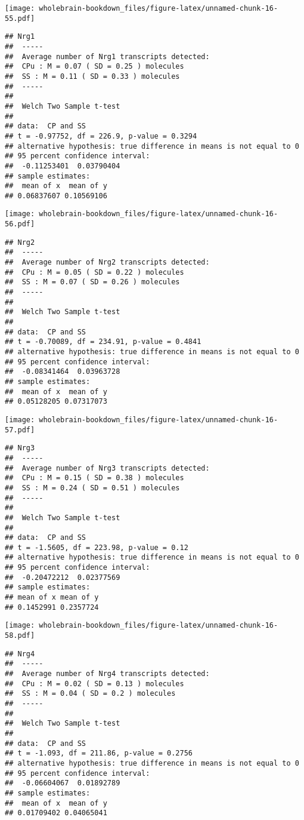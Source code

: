 \documentclass[]{book}
\theoremstyle{definition}
\theoremstyle{definition}
\theoremstyle{remark}
\begin{document}
\texttt{[image: wholebrain-bookdown\_files/figure-latex/unnamed-chunk-16-55.pdf]}

\begin{verbatim}
## Nrg1
##  -----
##  Average number of Nrg1 transcripts detected:
##  CPu : M = 0.07 ( SD = 0.25 ) molecules 
##  SS : M = 0.11 ( SD = 0.33 ) molecules
##  -----
## 
##  Welch Two Sample t-test
## 
## data:  CP and SS
## t = -0.97752, df = 226.9, p-value = 0.3294
## alternative hypothesis: true difference in means is not equal to 0
## 95 percent confidence interval:
##  -0.11253401  0.03790404
## sample estimates:
##  mean of x  mean of y 
## 0.06837607 0.10569106
\end{verbatim}

\texttt{[image: wholebrain-bookdown\_files/figure-latex/unnamed-chunk-16-56.pdf]}

\begin{verbatim}
## Nrg2
##  -----
##  Average number of Nrg2 transcripts detected:
##  CPu : M = 0.05 ( SD = 0.22 ) molecules 
##  SS : M = 0.07 ( SD = 0.26 ) molecules
##  -----
## 
##  Welch Two Sample t-test
## 
## data:  CP and SS
## t = -0.70089, df = 234.91, p-value = 0.4841
## alternative hypothesis: true difference in means is not equal to 0
## 95 percent confidence interval:
##  -0.08341464  0.03963728
## sample estimates:
##  mean of x  mean of y 
## 0.05128205 0.07317073
\end{verbatim}

\texttt{[image: wholebrain-bookdown\_files/figure-latex/unnamed-chunk-16-57.pdf]}

\begin{verbatim}
## Nrg3
##  -----
##  Average number of Nrg3 transcripts detected:
##  CPu : M = 0.15 ( SD = 0.38 ) molecules 
##  SS : M = 0.24 ( SD = 0.51 ) molecules
##  -----
## 
##  Welch Two Sample t-test
## 
## data:  CP and SS
## t = -1.5605, df = 223.98, p-value = 0.12
## alternative hypothesis: true difference in means is not equal to 0
## 95 percent confidence interval:
##  -0.20472212  0.02377569
## sample estimates:
## mean of x mean of y 
## 0.1452991 0.2357724
\end{verbatim}

\texttt{[image: wholebrain-bookdown\_files/figure-latex/unnamed-chunk-16-58.pdf]}

\begin{verbatim}
## Nrg4
##  -----
##  Average number of Nrg4 transcripts detected:
##  CPu : M = 0.02 ( SD = 0.13 ) molecules 
##  SS : M = 0.04 ( SD = 0.2 ) molecules
##  -----
## 
##  Welch Two Sample t-test
## 
## data:  CP and SS
## t = -1.093, df = 211.86, p-value = 0.2756
## alternative hypothesis: true difference in means is not equal to 0
## 95 percent confidence interval:
##  -0.06604067  0.01892789
## sample estimates:
##  mean of x  mean of y 
## 0.01709402 0.04065041
\end{verbatim}
\end{document}
